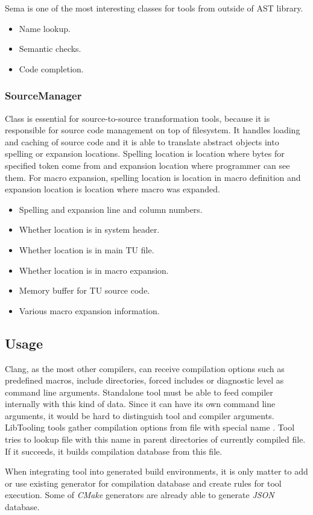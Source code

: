 Sema is one of the most interesting classes for tools from outside of AST library.

\begin{itemize}
\item Name lookup.
\item Semantic checks.
\item Code completion.
\end{itemize}

\subsubsection{SourceManager}
Class is essential for source-to-source transformation tools, because it is responsible for source code management on top of filesystem. It handles loading and caching of source code and it is able to translate abstract  objects into spelling or expansion locations. Spelling location is location where bytes for specified token come from and expansion location where programmer can see them. For macro expansion, spelling location is location in macro definition and expansion location is location where macro was expanded.

\begin{itemize}
\item Spelling and expansion line and column numbers.
\item Whether location is in system header.
\item Whether location is in main TU file.
\item Whether location is in macro expansion.
\item Memory buffer for TU source code.
\item Various macro expansion information.
\end{itemize}

\subsection{Usage}
Clang, as the most other compilers, can receive compilation options such as predefined macros, include directories, forced includes or diagnostic level as command line arguments. Standalone tool must be able to feed compiler internally with this kind of data. Since it can have its own command line arguments, it would be hard to distinguish tool and compiler arguments. LibTooling tools gather compilation options from file with special name . Tool tries to lookup file with this name in parent directories of currently compiled file. If it succeeds, it builds compilation database from this file.

When integrating tool into generated build environments, it is only matter to add or use existing generator for compilation database and create rules for tool execution. Some of \emph{CMake} generators are already able to generate \emph{JSON} database.